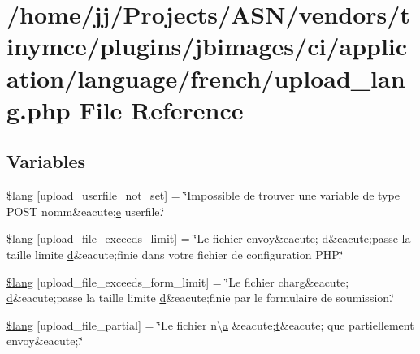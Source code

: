 \hypertarget{application_2language_2french_2upload__lang_8php}{}\section{/home/jj/\+Projects/\+A\+S\+N/vendors/tinymce/plugins/jbimages/ci/application/language/french/upload\+\_\+lang.php File Reference}
\label{application_2language_2french_2upload__lang_8php}
\subsection*{Variables}
\begin{DoxyCompactItemize}
\item 
\hyperlink{application_2language_2french_2upload__lang_8php_a6d12ff4074b1e4c6f22a4a5107fae5ee}{\$lang} \mbox{[}\textquotesingle{}upload\+\_\+userfile\+\_\+not\+\_\+set\textquotesingle{}\mbox{]} = \char`\"{}Impossible de trouver une variable de \hyperlink{_ossn_wall_2actions_2wall_2post_2group_8php_a2dc1bb4e1ed0029daa81ac0776b14b51}{type} P\+O\+ST nomm\&eacute;\hyperlink{jquery-ui_8min_8js_abea95a4e94bc6f4151d5683d4c12c3f4}{e} userfile.\char`\"{}
\item 
\hyperlink{application_2language_2french_2upload__lang_8php_a9028f049ebbe292a27e0e2b2e5f7d660}{\$lang} \mbox{[}\textquotesingle{}upload\+\_\+file\+\_\+exceeds\+\_\+limit\textquotesingle{}\mbox{]} = \char`\"{}Le fichier envoy\&eacute; \hyperlink{fullpage_2plugin_8min_8js_a86138ad7596633fd5f960ad9c40f8862}{d}\&eacute;passe la taille limite \hyperlink{fullpage_2plugin_8min_8js_a86138ad7596633fd5f960ad9c40f8862}{d}\&eacute;finie dans votre fichier de configuration P\+H\+P.\char`\"{}
\item 
\hyperlink{application_2language_2french_2upload__lang_8php_af6f65d563af150d50dfc6957079fd529}{\$lang} \mbox{[}\textquotesingle{}upload\+\_\+file\+\_\+exceeds\+\_\+form\+\_\+limit\textquotesingle{}\mbox{]} = \char`\"{}Le fichier charg\&eacute; \hyperlink{fullpage_2plugin_8min_8js_a86138ad7596633fd5f960ad9c40f8862}{d}\&eacute;passe la taille limite \hyperlink{fullpage_2plugin_8min_8js_a86138ad7596633fd5f960ad9c40f8862}{d}\&eacute;finie par le formulaire de soumission.\char`\"{}
\item 
\hyperlink{application_2language_2french_2upload__lang_8php_a79751b02ce35007a90bd9052f83deed9}{\$lang} \mbox{[}\textquotesingle{}upload\+\_\+file\+\_\+partial\textquotesingle{}\mbox{]} = \char`\"{}Le fichier n\textbackslash{}\textquotesingle{}\hyperlink{_chart_8min_8js_aef3b685c08bc6c76c8e729bd0e93901d}{a} \&eacute;\hyperlink{jquery-ui_8min_8js_acf335ef347969ef6dc8387e680fb289e}{t}\&eacute; que partiellement envoy\&eacute;.\char`\"{}

\end{DoxyCompactItemize}
